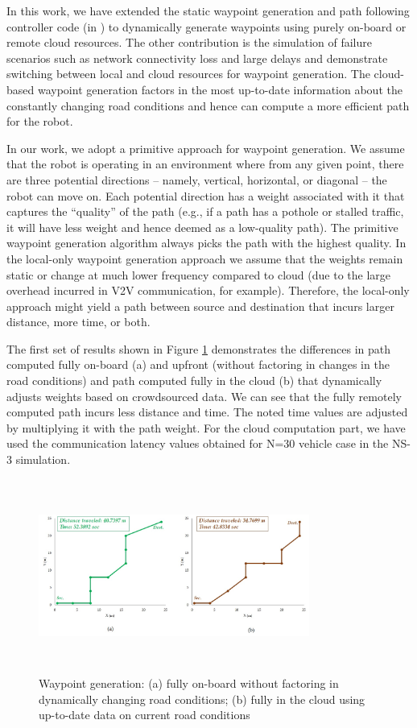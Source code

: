 In this work, we have extended the static waypoint generation and path following controller code (in \cite{ref:matlab_rst}) to dynamically generate waypoints using purely on-board or remote cloud resources. The other contribution is the simulation of failure scenarios such as network connectivity loss and large delays and demonstrate switching between local and cloud resources for waypoint generation. The cloud-based waypoint generation factors in the most up-to-date information about the constantly changing road conditions and hence can compute a more efficient path for the robot. 

In our work, we adopt a primitive approach for waypoint generation. We assume that the robot is operating in an environment where from any given point, there are three potential directions – namely, vertical, horizontal, or diagonal -- the robot can move on. Each potential direction has a weight associated with it that captures the “quality” of the path (e.g., if a path has a pothole or stalled traffic, it will have less weight and hence deemed as a low-quality path). The primitive waypoint generation algorithm always picks the path with the highest quality. In the local-only waypoint generation approach we assume that the weights remain static or change at much lower frequency compared to cloud (due to the large overhead incurred in V2V communication, for example). Therefore, the local-only approach might yield a path between source and destination that incurs larger distance, more time, or both. 

The first set of results shown in Figure \ref{fig:PF_A_B} demonstrates the differences in path computed fully on-board (a) and upfront (without factoring in changes in the road conditions) and path computed fully in the cloud (b) that dynamically adjusts weights based on crowdsourced data. We can see that the fully remotely computed path incurs less distance and time. The noted time values are adjusted by multiplying it with the path weight. For the cloud computation part, we have used the communication latency values obtained for N=30 vehicle case in the NS-3 simulation.

\begin{figure}
\includegraphics[width=3.5in,height=2.5in]{pf_a_b.jpg}
 \caption{Waypoint generation: (a) fully on-board without factoring in dynamically changing road conditions; (b) fully in the cloud using up-to-date data on current road conditions  \label{fig:PF_A_B}}
\end{figure}

